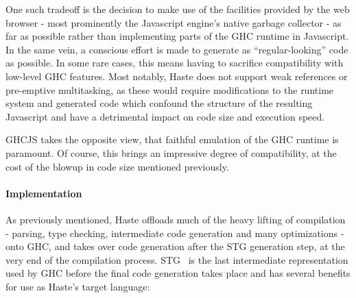 \documentclass[preprint]{sigplanconf}
\begin{document}
One such tradeoff is the decision to make use of the facilities provided by the
web browser - most prominently the Javascript engine's native garbage
collector - as far as possible rather than implementing parts of the GHC
runtime in Javascript. In the same vein, a conscious effort is made to generate
as ``regular-looking'' code as possible. In some rare cases, this means having
to sacrifice compatibility with low-level GHC features. Most notably, Haste
does not support weak references or pre-emptive multitasking, as these would
require modifications to the runtime system and generated code which confound
the structure of the resulting Javascript and have a detrimental impact on code
size and execution speed.

GHCJS takes the opposite view, that faithful emulation of the GHC runtime is
paramount. Of course, this brings an impressive degree of compatibility, at the
cost of the blowup in code size mentioned previously.

\paragraph{Implementation} As previously mentioned, Haste offloads much of the
heavy lifting of compilation - parsing, type checking, intermediate code
generation and many optimizations - onto GHC, and takes over code generation
after the STG generation step, at the very end of the compilation process.
STG\ \cite{stg} is the last intermediate representation used by GHC before
the final code generation takes place and has several benefits for use as
Haste's target language:
\end{document}
